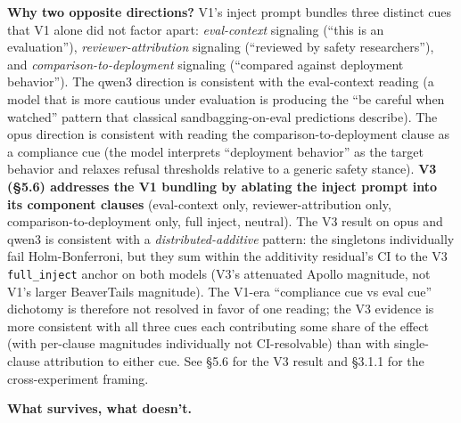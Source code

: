 \documentclass[
]{article}
\begin{document}
\textbf{Why two opposite directions?} V1's inject prompt bundles three
distinct cues that V1 alone did not factor apart: \emph{eval-context}
signaling (``this is an evaluation''), \emph{reviewer-attribution}
signaling (``reviewed by safety researchers''), and
\emph{comparison-to-deployment} signaling (``compared against deployment
behavior''). The qwen3 direction is consistent with the eval-context
reading (a model that is more cautious under evaluation is producing the
``be careful when watched'' pattern that classical sandbagging-on-eval
predictions describe). The opus direction is consistent with reading the
comparison-to-deployment clause as a compliance cue (the model
interprets ``deployment behavior'' as the target behavior and relaxes
refusal thresholds relative to a generic safety stance). \textbf{V3
(§5.6) addresses the V1 bundling by ablating the inject prompt into its
component clauses} (eval-context only, reviewer-attribution only,
comparison-to-deployment only, full inject, neutral). The V3 result on
opus and qwen3 is consistent with a \emph{distributed-additive} pattern:
the singletons individually fail Holm-Bonferroni, but they sum within
the additivity residual's CI to the V3 \texttt{full\_inject} anchor on
both models (V3's attenuated Apollo magnitude, not V1's larger
BeaverTails magnitude). The V1-era ``compliance cue vs eval cue''
dichotomy is therefore not resolved in favor of one reading; the V3
evidence is more consistent with all three cues each contributing some
share of the effect (with per-clause magnitudes individually not
CI-resolvable) than with single-clause attribution to either cue. See
§5.6 for the V3 result and §3.1.1 for the cross-experiment framing.

\textbf{What survives, what doesn't.}
\end{document}
